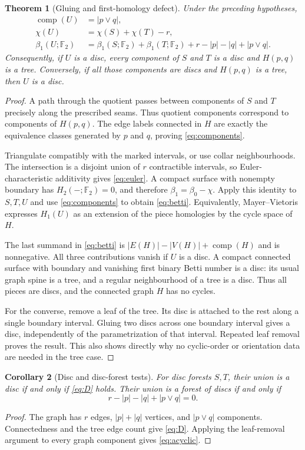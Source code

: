 \documentclass[11pt,a4paper]{article}
\newtheorem{theorem}{Theorem}[section]
\newtheorem{corollary}[theorem]{Corollary}
\theoremstyle{remark}\newtheorem{remark}[theorem]{Remark}
\newcommand{\F}{\mathbb F_2}
\newcommand{\comp}{\operatorname{comp}}
\newcommand{\pjoin}{\vee}
\begin{document}
\begin{theorem}[Gluing and first-homology defect]\label{thm:glue}
Under the preceding hypotheses,
\begin{align}
 \comp(U)&=|p\pjoin q|,\label{eq:components}\\
 \chi(U)&=\chi(S)+\chi(T)-r,\label{eq:euler}\\
 \beta_1(U;\F)&=\beta_1(S;\F)+\beta_1(T;\F)
                  +r-|p|-|q|+|p\pjoin q|.\label{eq:betti}
\end{align}
Consequently, if $U$ is a disc, every component of $S$ and $T$ is a disc and $H(p,q)$ is a tree. Conversely, if all those components are discs and $H(p,q)$ is a tree, then $U$ is a disc.
\end{theorem}
\begin{proof}
A path through the quotient passes between components of $S$ and $T$ precisely along the prescribed seams. Thus quotient components correspond to components of $H(p,q)$. The edge labels connected in $H$ are exactly the equivalence classes generated by $p$ and $q$, proving \eqref{eq:components}.

Triangulate compatibly with the marked intervals, or use collar neighbourhoods. The intersection is a disjoint union of $r$ contractible intervals, so Euler-characteristic additivity gives \eqref{eq:euler}. A compact surface with nonempty boundary has $H_2(-;\F)=0$, and therefore $\beta_1=\beta_0-\chi$. Apply this identity to $S,T,U$ and use \eqref{eq:components} to obtain \eqref{eq:betti}. Equivalently, Mayer--Vietoris expresses $H_1(U)$ as an extension of the piece homologies by the cycle space of $H$.

The last summand in \eqref{eq:betti} is $|E(H)|-|V(H)|+\comp(H)$ and is nonnegative. All three contributions vanish if $U$ is a disc. A compact connected surface with boundary and vanishing first binary Betti number is a disc: its usual graph spine is a tree, and a regular neighbourhood of a tree is a disc. Thus all pieces are discs, and the connected graph $H$ has no cycles.

For the converse, remove a leaf of the tree. Its disc is attached to the rest along a single boundary interval. Gluing two discs across one boundary interval gives a disc, independently of the parametrization of that interval. Repeated leaf removal proves the result. This also shows directly why no cyclic-order or orientation data are needed in the tree case.
\end{proof}

\begin{corollary}[Disc and disc-forest tests]\label{cor:disc}
For disc forests $S,T$, their union is a disc if and only if \eqref{eq:D} holds. Their union is a forest of discs if and only if
\begin{equation}\label{eq:acyclic}
 r-|p|-|q|+|p\pjoin q|=0.
\end{equation}
\end{corollary}
\begin{proof}
The graph has $r$ edges, $|p|+|q|$ vertices, and $|p\pjoin q|$ components. Connectedness and the tree edge count give \eqref{eq:D}. Applying the leaf-removal argument to every graph component gives \eqref{eq:acyclic}.
\end{proof}
\end{document}
